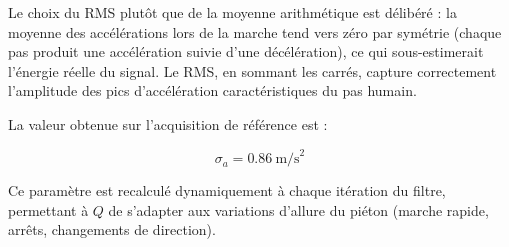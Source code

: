 Le choix du RMS plutôt que de la moyenne arithmétique est délibéré : la
moyenne des accélérations lors de la marche tend vers zéro par symétrie
(chaque pas produit une accélération suivie d'une décélération), ce qui
sous-estimerait l'énergie réelle du signal. Le RMS, en sommant les carrés,
capture correctement l'amplitude des pics d'accélération caractéristiques
du pas humain.

La valeur obtenue sur l'acquisition de référence est :

\begin{equation}
    \sigma_a = 0.86 \ \text{m/s}^2
\end{equation}

Ce paramètre est recalculé dynamiquement à chaque itération du filtre, 
permettant à $Q$ de s'adapter aux variations d'allure du piéton (marche
rapide, arrêts, changements de direction).